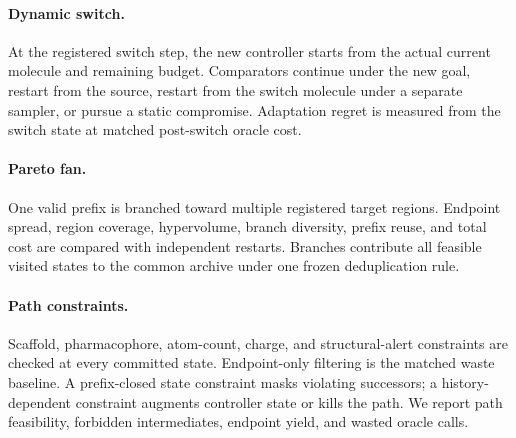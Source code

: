 \paragraph{Dynamic switch.}
At the registered switch step, the new controller starts from the actual
current molecule and remaining budget.  Comparators continue under the new
goal, restart from the source, restart from the switch molecule under a
separate sampler, or pursue a static compromise.  Adaptation regret is
measured from the switch state at matched post-switch oracle cost.

\paragraph{Pareto fan.}
One valid prefix is branched toward multiple registered target regions.
Endpoint spread, region coverage, hypervolume, branch diversity, prefix reuse,
and total cost are compared with independent restarts.  Branches contribute
all feasible visited states to the common archive under one frozen
deduplication rule.

\paragraph{Path constraints.}
Scaffold, pharmacophore, atom-count, charge, and structural-alert constraints
are checked at every committed state.  Endpoint-only filtering is the matched
waste baseline.  A prefix-closed state constraint masks violating successors;
a history-dependent constraint augments controller state or kills the path.
We report path feasibility, forbidden intermediates, endpoint yield, and
wasted oracle calls.

